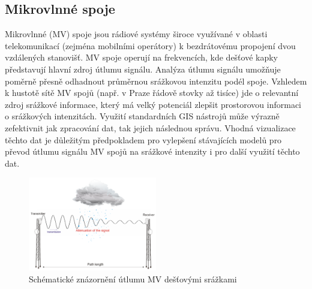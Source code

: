 \documentclass[a4paper,12pt]{article}
\begin{document}




\subsection{Mikrovlnné spoje}
Mikrovlnné (MV) spoje jsou rádiové systémy široce využívané v oblasti telekomunikací (zejména 
mobilními operátory) k bezdrátovému propojení dvou vzdálených stanovišť. MV spoje operují na 
frekvencích, kde dešťové kapky představují hlavní zdroj útlumu signálu. Analýza útlumu signálu 
umožňuje poměrně přesně odhadnout průměrnou srážkovou intenzitu podél spoje. Vzhledem 
k hustotě sítě MV spojů (např. v Praze řádově stovky až tisíce) jde o relevantní zdroj srážkové 
informace, který má velký potenciál zlepšit prostorovou informaci o srážkových intenzitách. Využití 
standardních GIS nástrojů může výrazně zefektivnit jak zpracování dat, tak jejich následnou správu. 
Vhodná vizualizace těchto dat je důležitým předpokladem pro vylepšení stávajících modelů pro 
převod útlumu signálu MV spojů na srážkové intenzity i pro další využití těchto dat. 
\begin{figure}[h!]
    \centering
    \includegraphics[width=0.5\textwidth]{./img/srazky/microwave_link.png}
    \caption[Rušení radaru]{\centering Schématické znázornění útlumu MV dešťovými srážkami  \footnotemark }
 \end{figure}   
    
\end{document}
